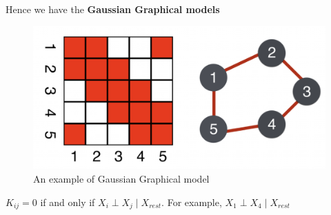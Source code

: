 Hence we have the \textbf{Gaussian Graphical models}
\begin{figure}[H]
  \centering
  \includegraphics[width = .7\linewidth]{figures/section2/figure_2_7.png}
  \caption{An example of Gaussian Graphical model}
  \label{fig:ggm}
\end{figure}
$K_{ij}=0$ if and only if $X_i\perp X_j\mid X_{rest}$. For example, $X_1\perp X_4\mid X_{rest}$